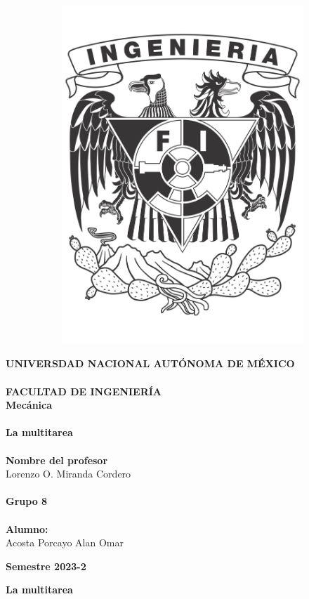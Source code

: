 \documentclass[12pt, titlepage]{article}
\begin{document}
\begin{titlepage}
\begin{figure}[ht]
\begin{subfigure}[l]{0.2\linewidth}
                \includegraphics[width=\textwidth]{Escudo_FI.png}
            \end{subfigure} 
        \end{figure}

        \large \textbf{UNIVERSDAD NACIONAL AUTÓNOMA DE MÉXICO\\}
        \textbf{\\FACULTAD DE INGENIERÍA\\} 
        \hfill \break
        \Large\textbf{Mecánica\\}
        \textbf{\\La multitarea\\}
        \Large \textbf{\\Nombre del profesor\\}
        \large Lorenzo O. Miranda Cordero\\
        \Large \textbf{\\Grupo 8\\}
        \textbf{\\Alumno:\\}
        Acosta Porcayo Alan Omar\\

        \vspace{1cm}
        \begin{flushright}
            \Large \textbf{Semestre 2023-2}
        \end{flushright}
    \end{titlepage}

    \begin{center}
        \textbf{La multitarea}
    \end{center}
    
    \noindent 
\end{document}
